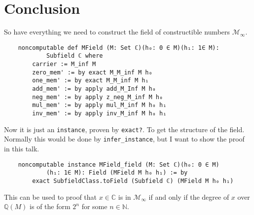 \section{Conclusion}

So have everything we need to construct the field of constructible numbers $\mathcal{M}_{\infty}$.
\begin{lstlisting}
    noncomputable def MField (M: Set ℂ)(h₀: 0 ∈ M)(h₁: 1∈ M):
            Subfield ℂ where
        carrier := M_inf M
        zero_mem' := by exact M_M_inf M h₀
        one_mem' := by exact M_M_inf M h₁
        add_mem' := by apply add_M_Inf M h₀
        neg_mem' := by apply z_neg_M_inf M h₀
        mul_mem' := by apply mul_M_inf M h₀ h₁
        inv_mem' := by apply inv_M_inf M h₀ h₁
\end{lstlisting}

Now it is just an \verb|instance|, proven by \verb|exact?|. To get the structure of the field. Normally this would be done by \verb|infer_instance|, but I want to show the proof in this talk.
\begin{lstlisting}
    noncomputable instance MField_field (M: Set ℂ)(h₀: 0 ∈ M)
            (h₁: 1∈ M): Field (MField M h₀ h₁) := by
        exact SubfieldClass.toField (Subfield ℂ) (MField M h₀ h₁)
\end{lstlisting}

This can be used to proof that $x\in \mathbb{C}$ is in $\mathcal{M}_{\infty}$ if and only if the degree of $x$ over $\mathbb{Q}(M)$ is of the form $2^n$ for some $n\in \mathbb{N}$.